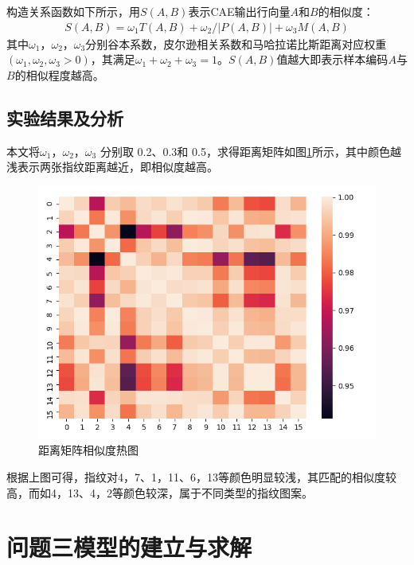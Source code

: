 \documentclass{whutmod}
\begin{document}
			构造关系函数如下所示，用$S(A,B)$表示CAE输出行向量$A$和$B$的相似度：
			\begin{gather}
			S(A,B)=\omega_1 T(A,B)+\omega_2/ |P(A,B)|+\omega_3 M(A,B)
			\end{gather}
			其中$\omega_1$，$\omega_2$，$\omega_3$分别谷本系数，皮尔逊相关系数和马哈拉诺比斯距离对应权重$(\omega_1,\omega_2,\omega_3>0)$，其满足$\omega_1+\omega_2+\omega_3=1$。$S(A,B)$值越大即表示样本编码$A$与$B$的相似程度越高。



        \subsection{实验结果及分析}
        
        本文将$\omega_1$，$\omega_2$，$\omega_3$ 分别取 0.2、0.3和 0.5，求得距离矩阵如图\ref{lsst}所示，其中颜色越浅表示两张指纹距离越近，即相似度越高。   
       	\begin{figure}[H]
        	\centering
        	\includegraphics[width=\textwidth]{figures/retu.png}
        	\caption{距离矩阵相似度热图}\label{lsst}
        \end{figure}
        
        根据上图可得，指纹对{4，7}、{1，11}、{6，13}等颜色明显较浅，其匹配的相似度较高，而如{4，13}、{4，2}等颜色较深，属于不同类型的指纹图案。


    \section{问题三模型的建立与求解}
\end{document}
